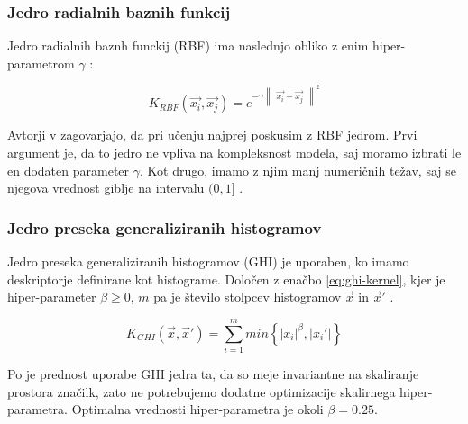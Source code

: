 \subsubsection{Jedro radialnih baznih funkcij}{
Jedro radialnih baznh funckij (RBF) ima naslednjo obliko z enim hiper-parametrom $\gamma$ \cite{hsu2003practical}:

\begin{equation} \label{eq:rbf-kernel}
		K_{RBF}(\vec{x_i}, \vec{x_j}) = e^{
        	-\gamma 
        	\begin{Vmatrix}
        		\vec{x_i} - \vec{x_j}
        	\end{Vmatrix}^2
        }
\end{equation}

Avtorji v \cite{hsu2003practical} zagovarjajo, da pri učenju najprej poskusim z RBF jedrom. Prvi argument je, da to jedro ne vpliva na kompleksnost modela, saj moramo izbrati le en dodaten parameter $\gamma$. Kot drugo, imamo z njim manj numeričnih težav, saj se njegova vrednost giblje na intervalu $(0, 1]$ \cite{hsu2003practical}. 



\subsubsection{Jedro preseka generaliziranih histogramov}
Jedro preseka generaliziranih histogramov (GHI) je uporaben, ko imamo deskriptorje definirane kot histograme. Določen z enačbo \eqref{eq:ghi-kernel}, kjer je hiper-parameter $\beta \geq 0$, $m$ pa je število stolpcev histogramov $\vec{x}$ in $\vec{x}'$ \cite{boughorbel2005generalized}.

\begin{equation}\label{eq:ghi-kernel}
K_{GHI}(\vec{x}, \vec{x}') = \sum_{i=1}^m min\left\{ \left| x_i \right|^\beta, \left|  x_i' \right| \right\}
\end{equation}

Po \cite{boughorbel2005generalized} je prednost uporabe GHI jedra ta, da so meje invariantne na skaliranje prostora značilk, zato ne potrebujemo dodatne optimizacije skalirnega hiper-parametra. Optimalna vrednosti hiper-parametra je okoli $\beta=0.25$.







}
